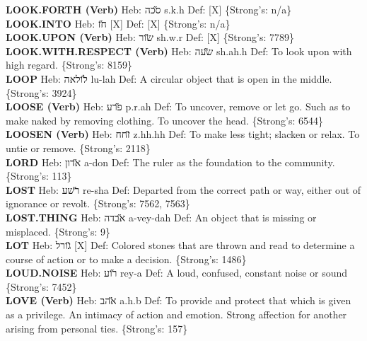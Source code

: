 {\textbf{LOOK.FORTH (Verb)} Heb: {\large\H סכה} s.k.h Def: {[}X{]} \{Strong's: n/a\}\hfill{}\\

\textbf{LOOK.INTO} Heb: {\large\H חז} {[}X{]} Def: {[}X{]} \{Strong's: n/a\}\hfill{}\\

\textbf{LOOK.UPON (Verb)} Heb: {\large\H שור} sh.w.r Def: {[}X{]} \{Strong's: 7789\}\hfill{}\\

\textbf{LOOK.WITH.RESPECT (Verb)} Heb: {\large\H שעה} sh.ah.h Def: To look upon with high regard. \{Strong's: 8159\}\hfill{}\\

\textbf{LOOP} Heb: {\large\H לולאה} lu-lah Def: A circular object that is open in the middle. \{Strong's: 3924\}\hfill{}\\

\textbf{LOOSE (Verb)} Heb: {\large\H פרע} p.r.ah Def: To uncover, remove or let go. Such as to make naked by removing clothing. To uncover the head. \{Strong's: 6544\}\hfill{}\\

\textbf{LOOSEN (Verb)} Heb: {\large\H זחח} z.hh.hh Def: To make less tight; slacken or relax. To untie or remove. \{Strong's: 2118\}\hfill{}\\

\textbf{LORD} Heb: {\large\H אדון} a-don Def: The ruler as the foundation to the community. \{Strong's: 113\}\hfill{}\\

\textbf{LOST} Heb: {\large\H רשע} re-sha Def: Departed from the correct path or way, either out of ignorance or revolt. \{Strong's: 7562, 7563\}\hfill{}\\

\textbf{LOST.THING} Heb: {\large\H אבדה} a-vey-dah Def: An object that is missing or misplaced. \{Strong's: 9\}\hfill{}\\

\textbf{LOT} Heb: {\large\H גורל} {[}X{]} Def: Colored stones that are thrown and read to determine a course of action or to make a decision. \{Strong's: 1486\}\hfill{}\\

\textbf{LOUD.NOISE} Heb: {\large\H רוע} rey-a Def: A loud, confused, constant noise or sound \{Strong's: 7452\}\hfill{}\\

\textbf{LOVE (Verb)} Heb: {\large\H אהב} a.h.b Def: To provide and protect that which is given as a privilege. An intimacy of action and emotion. Strong affection for another arising from personal ties. \{Strong's: 157\}\hfill{}\\

}
